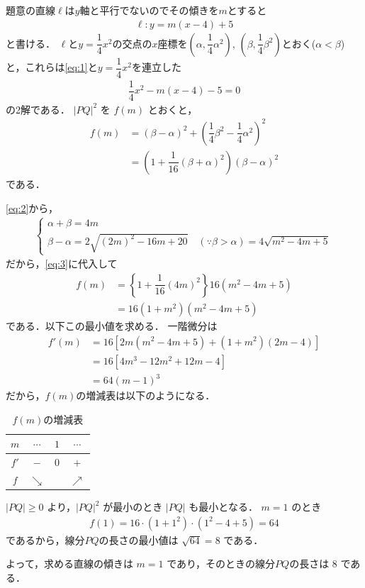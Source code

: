 \documentclass[../../main.tex]{subfiles}
\begin{document}
題意の直線$\ell$は$y$軸と平行でないのでその傾きを$m$とすると
\begin{align}
  \ell : y = m(x-4)+5 \label{eq:1}
\end{align}
と書ける．
$\ell$と$y=\dfrac{1}{4}x^2$の交点の$x$座標を$\left(\alpha, \dfrac{1}{4}\alpha^2\right)$, $\left(\beta, \dfrac{1}{4}\beta^2\right)$とおく($\alpha < \beta$)と，これらは\cref{eq:1}と$y=\dfrac{1}{4}x^2$を連立した
\begin{align}
  \dfrac{1}{4}x^2 - m(x-4) - 5 = 0 \label{eq:2}
\end{align}
の2解である．
$|PQ|^2$ を $f(m)$ とおくと，
\begin{align}
  f(m)
  & = (\beta - \alpha)^2 + \left( \dfrac{1}{4}\beta^2 - \dfrac{1}{4}\alpha^2 \right)^2 \\
  & = \left( 1 + \dfrac{1}{16}(\beta + \alpha)^2 \right)(\beta - \alpha)^2 \label{eq:3}
\end{align}
である．

\cref{eq:2}から，
\begin{align}
  \begin{cases}
    \alpha + \beta = 4m \\
    \beta - \alpha
    = 2 \sqrt{(2m)^2 - 16m + 20} \quad (\because \beta > \alpha)
    = 4 \sqrt{m^2 - 4m + 5}
  \end{cases} \label{eq:4}
\end{align}
だから，\cref{eq:3}に代入して
\begin{align}
  f(m)
  &= \left\{ 1 + \dfrac{1}{16}(4m)^2 \right\} 16(m^2 - 4m + 5) \\
  &= 16(1+m^2)(m^2 - 4m + 5)
\end{align}
である．以下この最小値を求める．
一階微分は
\begin{align}
  f'(m) &= 16 \left[ 2m(m^2-4m+5) + (1+m^2)(2m-4) \right] \\
  &= 16 \left[ 4m^3 - 12m^2 + 12m - 4 \right] \\
  &= 64 (m-1)^3
\end{align}
だから，$f(m)$の増減表は以下のようになる．

\begin{center}
  \begin{table}[htb]
    \centering
    \caption{$f(m)$の増減表}
    \begin{tabular}{|c|c|c|c|}
      \hline
      $m$ & $\cdots$ & $1$ & $\cdots$ \\ \hline
      $f'$ & $-$ & $0$ & $+$ \\ \hline
      $f$ & $\searrow$ & & $\nearrow$ \\ \hline
    \end{tabular}
  \end{table}
\end{center}

$|PQ| \ge 0$ より，$|PQ|^2$ が最小のとき $|PQ|$ も最小となる．
$m=1$ のとき
\begin{align}
  f(1) = 16 \cdot (1+1^2) \cdot (1^2-4+5) = 64
\end{align}
であるから，線分$PQ$の長さの最小値は $\sqrt{64} = 8$ である．

よって，求める直線の傾きは $m=1$ であり，そのときの線分$PQ$の長さは $8$ である．
\end{document}
